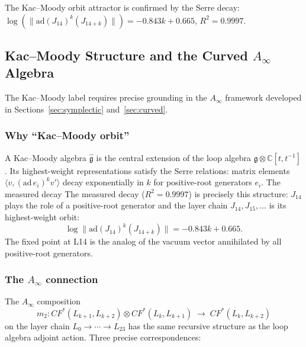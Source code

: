 \documentclass[11pt]{amsart}
\begin{document}
The Kac--Moody orbit attractor is confirmed by the Serre decay:
$\log(\|\mathrm{ad}(J_{14})^k(J_{14+k})\|) = -0.843k + 0.665$,
$R^2 = 0.9997$.

\subsection{Kac--Moody Structure and the Curved $A_\infty$ Algebra}
\label{sec:km_ainf}

The Kac--Moody label requires precise grounding in the $A_\infty$
framework developed in Sections~\ref{sec:symplectic} and~\ref{sec:curved}.

\subsubsection*{Why ``Kac--Moody orbit''}

A Kac--Moody algebra $\hat{\mathfrak{g}}$ is the central extension
of the loop algebra $\mathfrak{g} \otimes \mathbb{C}[t,t^{-1}]$.
Its highest-weight representations satisfy the Serre relations:
matrix elements $\langle v, (\mathrm{ad}\, e_i)^k v'\rangle$ decay
exponentially in $k$ for positive-root generators $e_i$.
The measured decay
The measured decay ($R^2=0.9997$) is precisely this structure:
$J_{14}$ plays the role of a positive-root generator and
the layer chain $J_{14}, J_{15}, \ldots$ is its
highest-weight orbit:
\[
  \log\|\mathrm{ad}(J_{14})^k(J_{14+k})\| = -0.843k + 0.665.
\]
The fixed point at L14 is the analog of the vacuum vector
annihilated by all positive-root generators.

\subsubsection*{The $A_\infty$ connection}

The $A_\infty$ composition
\[
  m_2: CF^*(L_{k+1},L_{k+2}) \otimes CF^*(L_k,L_{k+1})
  \;\to\; CF^*(L_k,L_{k+2})
\]
on the layer chain $L_0 \to \cdots \to L_{23}$
has the same recursive structure as the loop algebra
adjoint action.
Three precise correspondences:
\end{document}
